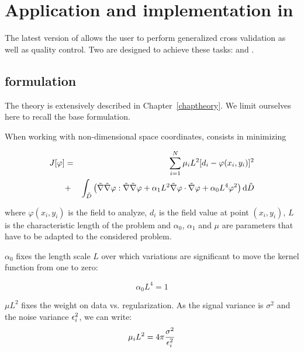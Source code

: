 
\section{Application and implementation in \diva\label{sec:divagcv}}

The latest version of \diva allows the user to perform generalized cross validation as well as quality control. Two are designed to achieve these tasks:  and .


\subsection{\diva formulation}

The \diva theory is extensively described in Chapter~\ref{chaptheory}. We limit ourselves here to recall the base formulation.

When working with non-dimensional space coordinates, \diva consists in minimizing

\begin{eqnarray}
{J}[\varphi]&=&\sum_{i=1}^{N}\mu_i L^2 [d_{i}-\varphi(x_{i},y_{i})]^{2}\\ \notag 
&+ &
 \int_{\tilde{D}}\left(
 \tilde{\nabla}\tilde{\nabla}\varphi : \tilde{\nabla}\tilde{\nabla}\varphi + { \alpha_{1} L^2}
\tilde{\nabla}\varphi \cdot \tilde{\nabla}\varphi + \alpha_{0} L^4 \varphi^{2} \right) \mbox{d} \tilde{D}
\end{eqnarray}

where $\varphi(x_{i},y_{i})$ is the field to analyze, $d_{i}$ is the field value at point $(x_i,y_i)$, $L$ is the characteristic length of the problem and $\alpha_{0}$, $\alpha_{1}$ and $\mu$ are parameters that have to be adapted to the considered problem. 


$\alpha_0$ fixes the length scale $L$ over which variations are significant to move the kernel function from one to zero:

\begin{equation}
\alpha_0 L^4 = 1
\end{equation}

$\mu L^2$ fixes the weight on data vs. regularization. As the signal variance is $\sigma^2$ and the noise variance $\epsilon_i^2$, we can write:
\begin{equation}
\mu_i L^2= 4 \pi \frac{\sigma^2}{\epsilon_i^2}
\end{equation}

